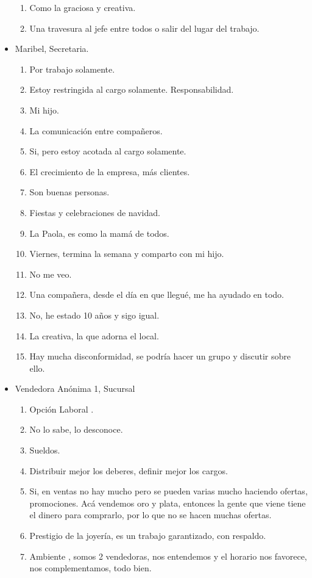 \begin{itemize}
\begin{enumerate}
		\item Como la graciosa y creativa.
		\item Una travesura al jefe entre todos o salir del lugar del trabajo.
    \end{enumerate}
    \item Maribel, Secretaria.
    \begin{enumerate}
		\item Por trabajo solamente.
		\item Estoy restringida al cargo solamente. Responsabilidad.
		\item Mi hijo.
		\item La comunicación entre compañeros.
		\item Si, pero estoy acotada al cargo solamente.
		\item El crecimiento de la empresa, más clientes.
		\item Son buenas personas.
		\item Fiestas y celebraciones de navidad.
		\item La Paola, es como la mamá de todos.
		\item Viernes, termina la semana y comparto con mi hijo.
		\item No me veo.
		\item Una compañera, desde el día en que llegué, me ha ayudado en todo.
		\item No, he estado 10 años y sigo igual.
		\item La creativa, la que adorna el local.
		\item Hay mucha disconformidad, se podría hacer un grupo y discutir sobre ello.
    \end{enumerate}
    \item Vendedora Anónima 1, Sucursal 
    \begin{enumerate}
        \item Opción Laboral .
        \item No lo sabe, lo desconoce.
        \item Sueldos.
        \item Distribuir mejor los deberes, definir mejor los cargos.
        \item Si, en ventas no hay mucho pero se pueden varias mucho haciendo ofertas, promociones. Acá vendemos oro y plata, entonces la gente que viene tiene el dinero para comprarlo, por lo que no se hacen muchas ofertas.
        \item Prestigio de la joyería, es un trabajo garantizado, con respaldo.
        \item Ambiente , somos 2 vendedoras, nos entendemos y el horario nos favorece, nos complementamos, todo bien.

\end{enumerate}
\end{itemize}
